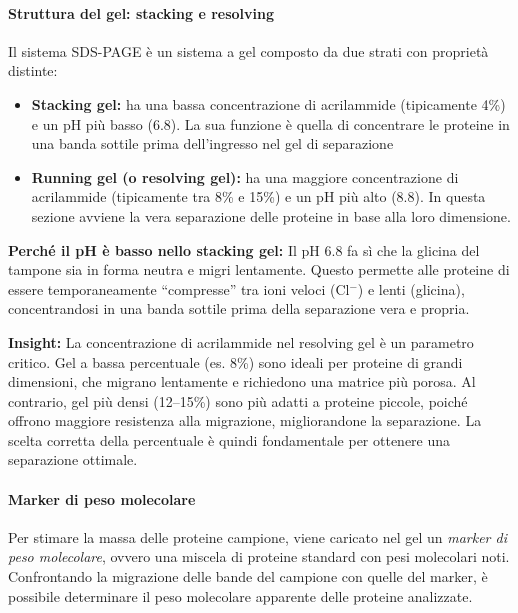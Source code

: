 \paragraph{Struttura del gel: stacking e resolving}
Il sistema SDS-PAGE è un sistema a gel composto da due strati con proprietà distinte:
\begin{itemize}
  \item \textbf{Stacking gel:} ha una bassa concentrazione di acrilammide (tipicamente 4\%) e un pH più basso (6.8). La sua funzione è quella di concentrare le proteine in una banda sottile prima dell’ingresso nel gel di separazione
  \item \textbf{Running gel (o resolving gel):} ha una maggiore concentrazione di acrilammide (tipicamente tra 8\% e 15\%) e un pH più alto (8.8). In questa sezione avviene la vera separazione delle proteine in base alla loro dimensione.
\end{itemize}

\begin{percheBox}
	\textbf{Perché il pH è basso nello stacking gel:}  
	Il pH 6.8 fa sì che la glicina del tampone sia in forma neutra e migri lentamente. Questo permette alle proteine di essere temporaneamente “compresse” tra ioni veloci (Cl$^-$) e lenti (glicina), concentrandosi in una banda sottile prima della separazione vera e propria.
\end{percheBox}


\begin{insightBox}
	\textbf{Insight:} La concentrazione di acrilammide nel resolving gel è un parametro critico.  
	Gel a bassa percentuale (es. 8\%) sono ideali per proteine di grandi dimensioni, che migrano lentamente e richiedono una matrice più porosa. Al contrario, gel più densi (12–15\%) sono più adatti a proteine piccole, poiché offrono maggiore resistenza alla migrazione, migliorandone la separazione. La scelta corretta della percentuale è quindi fondamentale per ottenere una separazione ottimale.
\end{insightBox}

\paragraph{Marker di peso molecolare}
Per stimare la massa delle proteine campione, viene caricato nel gel un \textit{marker di peso molecolare}, ovvero una miscela di proteine standard con pesi molecolari noti. Confrontando la migrazione delle bande del campione con quelle del marker, è possibile determinare il peso molecolare apparente delle proteine analizzate.


